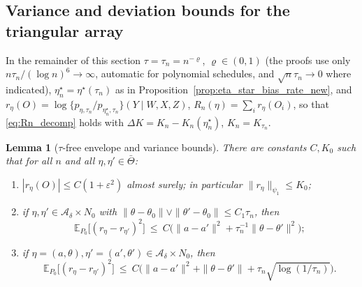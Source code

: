 \documentclass[11pt]{article}
\newtheorem{lemma}{Lemma}
\theoremstyle{definition}
\theoremstyle{plain}
\newcommand{\E}{\mathbb{E}}
\begin{document}
\subsection{Variance and deviation bounds for the triangular array}

In the remainder of this section $\tau=\tau_n=n^{-\varrho}$, $\varrho\in(0,1)$ (the proofs use only $n\tau_n/(\log n)^6\to\infty$, automatic for polynomial schedules, and $\sqrt n\tau_n\to0$ where indicated), $\eta_n^\star=\eta^\star(\tau_n)$ as in Proposition~\ref{prop:eta_star_bias_rate_new}, and
$r_\eta(O)=\log\{p_{\eta,\tau_n}/p_{\eta_n^\star,\tau_n}\}(Y\mid W,X,Z)$, $R_n(\eta)=\sum_ir_\eta(O_i)$, so that \eqref{eq:Rn_decomp} holds with $\Delta K=K_n-K_n(\eta_n^\star)$, $K_n=K_{\tau_n}$.

\begin{lemma}[$\tau$-free envelope and variance bounds]
\label{lem:variance_bounds_tau_n}
There are constants $C,K_0$ such that for all $n$ and all $\eta,\eta'\in\bar\Theta$:
\begin{enumerate}[label=(\roman*),nosep]
\item\label{vb:envelope} $|r_\eta(O)|\le C(1+\varepsilon^2)$ almost surely; in particular $\|r_\eta\|_{\psi_1}\le K_0$;
\item\label{vb:zone3} if $\eta,\eta'\in\mathcal A_\delta\times N_0$ with $\|\theta-\theta_0\|\vee\|\theta'-\theta_0\|\le C_1\tau_n$, then
\[
\E_{P_0}\big[(r_\eta-r_{\eta'})^2\big]\ \le\ C\big(\|a-a'\|^2+\tau_n^{-1}\|\theta-\theta'\|^2\big);
\]
\item\label{vb:zone2} if $\eta=(a,\theta),\eta'=(a',\theta')\in\mathcal A_\delta\times N_0$, then
\[
\E_{P_0}\big[(r_\eta-r_{\eta'})^2\big]\ \le\ C\big(\|a-a'\|^2+\|\theta-\theta'\|+\tau_n\sqrt{\log(1/\tau_n)}\big).
\]
\end{enumerate}
\end{lemma}
\end{document}
